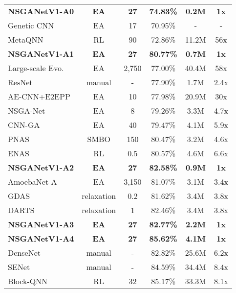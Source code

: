 \documentclass[journal]{IEEEtran}
\def\ourmethod{NSGANetV1}
\theoremstyle{definition}
\theoremstyle{remark}
\begin{document}
\begin{table*}[!htbp]
\begin{subtable}[h]{0.48\textwidth}
{\begin{tabular}{@{ }l|cc|ccc@{ }}
         &  &  &  &  &  \\ \midrule
        \textbf{\ourmethod{}-A0} & \textbf{EA} & \textbf{27} & \textbf{74.83\%} & \textbf{0.2M} & \textbf{1x} \\
        Genetic CNN \cite{genetic-cnn} & EA & 17 & 70.95\% & - & - \\
        MetaQNN \cite{baker2017metaqnn} & RL & 90 & 72.86\% & 11.2M & 56x \\ \midrule
        \textbf{\ourmethod{}-A1} & \textbf{EA} & \textbf{27} & \textbf{80.77\%} & \textbf{0.7M} & \textbf{1x} \\
        Large-scale Evo. \cite{real2017largescale} & EA & 2,750 & 77.00\% & 40.4M & 58x \\
        ResNet \cite{resnet} & manual & - & 77.90\% & 1.7M & 2.4x \\
        AE-CNN+E2EPP \cite{ae-cnn-e2epp} & EA & 10 & 77.98\% & 20.9M & 30x \\
        {NSGA-Net \cite{lu2019nsga}} & {EA} & {8} & {79.26\%} & {3.3M} & {4.7x} \\
        {CNN-GA \cite{cnn-ga}} & {EA} & {40} & {79.47\%} & {4.1M} & {5.9x} \\
        PNAS \cite{liu2018progressive} & SMBO & 150 & 80.47\% & 3.2M & 4.6x \\
        ENAS \cite{pmlr-v80-pham18a} & RL & 0.5 & 80.57\% & 4.6M & 6.6x \\ \midrule
        \textbf{\ourmethod{}-A2} & \textbf{EA} & \textbf{27} & \textbf{82.58\%} & \textbf{0.9M} & \textbf{1x} \\
        AmoebaNet-A \cite{real2019regularized} & EA & 3,150 & 81.07\% & 3.1M & 3.4x \\
        GDAS \cite{Dong_2019_CVPR} & relaxation & 0.2 & 81.62\% & 3.4M & 3.8x \\
        DARTS \cite{liu2018darts} & relaxation & 1 & 82.46\% & 3.4M & 3.8x \\ \midrule
        \textbf{\ourmethod{}-A3} & \textbf{EA} & \textbf{27} & \textbf{82.77\%} & \textbf{2.2M} & \textbf{1x} \\ \midrule
        \textbf{\ourmethod{}-A4} & \textbf{EA} & \textbf{27} & \textbf{85.62\%} & \textbf{4.1M} & \textbf{1x} \\
        DenseNet \cite{densenet} & manual & - & 82.82\% & 25.6M & 6.2x \\
        SENet \cite{hu2018squeeze} & manual & - & 84.59\% & 34.4M & 8.4x \\
        Block-QNN \cite{zhong2017blockqnn} & RL & 32 & 85.17\% & 33.3M & 8.1x \\ \bottomrule

\end{tabular}}
\end{subtable}
\end{table*}
\end{document}
